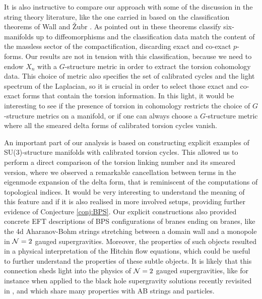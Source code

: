 \documentclass[11pt]{article}
\def\CN {{\cal N}}
\begin{document}
It is also instructive to compare our approach with some of the discussion in the string theory literature, like the one carried in \cite{Tomasiello:2005bp} based on the classification theorems of Wall \cite{WALL1966} and \v Zubr \cite{Zhubr1978ClassificationOS}. As pointed out in \cite{Tomasiello:2005bp} these theorems classify six-manifolds up to diffeomorphisms and the classification data match the content of the massless sector of the compactification, discarding exact and co-exact $p$-forms. Our results are not in tension with this classification, because we need to endow $X_n$ with a $G$-structure metric in order to extract the torsion cohomology data. This choice of metric also specifies the set of calibrated cycles and the light spectrum of the Laplacian, so it is crucial in order to select those exact and co-exact forms that contain the torsion information. In this light, it would be interesting to see if the presence of torsion in cohomology restricts the choice of $G$-structure metrics on a manifold, or if one can always choose a $G$-structure metric where all the smeared delta forms of calibrated torsion cycles vanish. 

An important part of our analysis is based on constructing explicit examples of SU(3)-structure manifolds with calibrated torsion cycles. This allowed us to perform a direct comparison of the torsion linking number and its smeared version, where we observed a remarkable cancellation between terms in the eigenmode expansion of the delta form, that is reminiscent of the computations of topological indices. It would be very interesting to understand the meaning of this feature and if it is also realised in more involved setups, providing further evidence of Conjecture \ref{conj:BPS}. Our explicit constructions also provided concrete EFT descriptions of BPS configurations of branes ending on branes, like the 4d Aharanov-Bohm strings stretching between a domain wall and a monopole in $\CN=2$ gauged supergravities. Moreover, the properties of such objects resulted in a physical interpretation of the Hitchin flow equations, which could be useful to further understand the properties of these subtle objects. It is likely that this connection sheds light into the physics of $\CN=2$ gauged supergravities, like for instance when applied to the black hole supergravity solutions recently revisited in \cite{Angius:2023xtu}, and which share many properties with AB strings and particles. 
\end{document}
